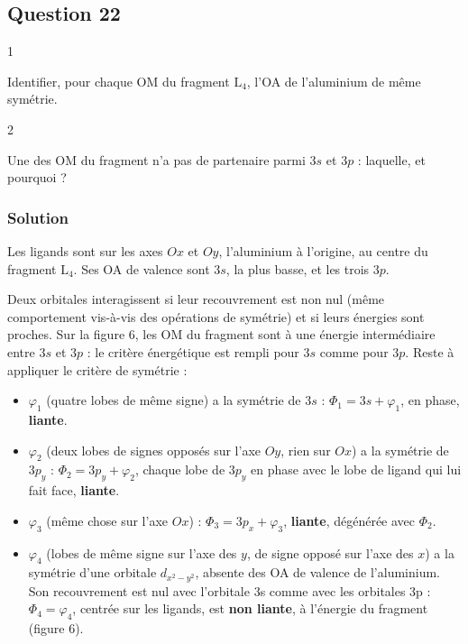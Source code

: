 \documentclass[11pt,a4paper]{article}
\providecommand{\tightlist}{\setlength{\itemsep}{0pt}\setlength{\parskip}{0pt}}
\begin{document}
\hypertarget{question-22}{%
\subsection{Question 22}\label{question-22}}

\begin{indication}{1}

Identifier, pour chaque OM du fragment \(\mathrm{L_4}\), l'OA de l'aluminium de même symétrie.

\end{indication}

\begin{indication}{2}

Une des OM du fragment n'a pas de partenaire parmi \(3s\) et \(3p\) : laquelle, et pourquoi ?

\end{indication}

\hypertarget{solution-21}{%
\subsubsection{Solution}\label{solution-21}}

Les ligands sont sur les axes \(Ox\) et \(Oy\), l'aluminium à l'origine, au centre du fragment \(\mathrm{L_4}\). Ses OA de valence sont \(3s\), la plus basse, et les trois \(3p\).

Deux orbitales interagissent si leur recouvrement est non nul (même comportement vis-à-vis des opérations de symétrie) et si leurs énergies sont proches. Sur la figure 6, les OM du fragment sont à une énergie intermédiaire entre \(3s\) et \(3p\) : le critère énergétique est rempli pour \(3s\) comme pour \(3p\). Reste à appliquer le critère de symétrie :

\begin{itemize}
\tightlist
\item
  \(\varphi_1\) (quatre lobes de même signe) a la symétrie de \(3s\) : \(\Phi_1=3s+\varphi_1\), en phase, \textbf{liante}.
\item
  \(\varphi_2\) (deux lobes de signes opposés sur l'axe \(Oy\), rien sur \(Ox\)) a la symétrie de \(3p_y\) : \(\Phi_2=3p_y+\varphi_2\), chaque lobe de \(3p_y\) en phase avec le lobe de ligand qui lui fait face, \textbf{liante}.
\item
  \(\varphi_3\) (même chose sur l'axe \(Ox\)) : \(\Phi_3=3p_x+\varphi_3\), \textbf{liante}, dégénérée avec \(\Phi_2\).
\item
  \(\varphi_4\) (lobes de même signe sur l'axe des \(y\), de signe opposé sur l'axe des \(x\)) a la symétrie d'une orbitale \(d_{x^2-y^2}\), absente des OA de valence de l'aluminium. Son recouvrement est nul avec l'orbitale 3s comme avec les orbitales 3p : \(\Phi_4=\varphi_4\), centrée sur les ligands, est \textbf{non liante}, à l'énergie du fragment (figure 6).
\end{itemize}
\end{document}
